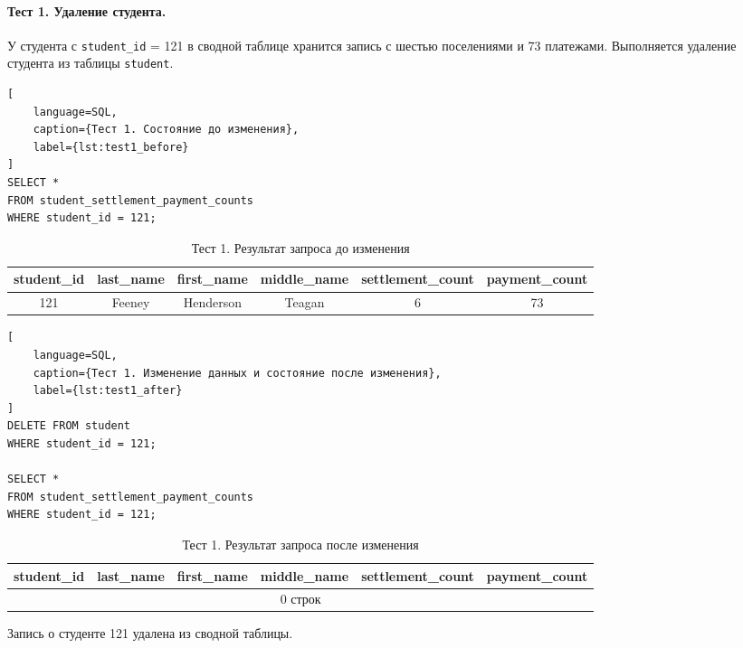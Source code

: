 \paragraph{Тест 1. Удаление студента.}
У студента с \texttt{student\_id} = 121 в сводной таблице хранится запись с шестью поселениями и 73 платежами. Выполняется удаление студента из таблицы \texttt{student}.

\begin{lstlisting}[
    language=SQL,
    caption={Тест 1. Состояние до изменения},
    label={lst:test1_before}
]
SELECT *
FROM student_settlement_payment_counts
WHERE student_id = 121;
\end{lstlisting}

\begin{table}[H]
\centering
\caption{Тест 1. Результат запроса до изменения}
\label{tab:test1_before}
\small
\begin{tabular}{|c|c|c|c|c|c|}
\hline
\textbf{student\_id} & \textbf{last\_name} & \textbf{first\_name} & \textbf{middle\_name} & \textbf{settlement\_count} & \textbf{payment\_count} \\ \hline
121 & Feeney & Henderson & Teagan & 6 & 73 \\ \hline
\end{tabular}
\end{table}

\begin{lstlisting}[
    language=SQL,
    caption={Тест 1. Изменение данных и состояние после изменения},
    label={lst:test1_after}
]
DELETE FROM student
WHERE student_id = 121;

SELECT *
FROM student_settlement_payment_counts
WHERE student_id = 121;
\end{lstlisting}

\begin{table}[H]
\centering
\caption{Тест 1. Результат запроса после изменения}
\label{tab:test1_after}
\small
\begin{tabular}{|c|c|c|c|c|c|}
\hline
\textbf{student\_id} & \textbf{last\_name} & \textbf{first\_name} & \textbf{middle\_name} & \textbf{settlement\_count} & \textbf{payment\_count} \\ \hline
\multicolumn{6}{|c|}{0 строк} \\ \hline
\end{tabular}
\end{table}

Запись о студенте 121 удалена из сводной таблицы.

